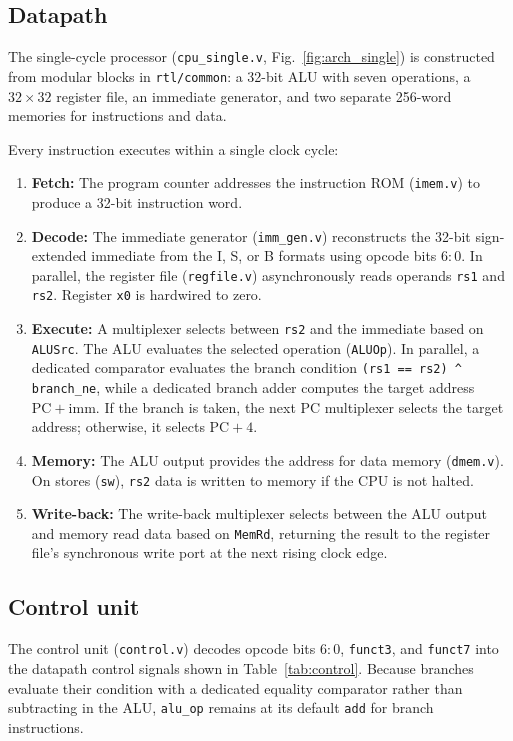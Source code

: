 \subsection{Datapath}
The single-cycle processor (\texttt{cpu\_single.v}, Fig.~\ref{fig:arch_single})
is constructed from modular blocks in \texttt{rtl/common}: a 32-bit ALU with
seven operations, a $32\times32$ register file, an immediate generator, and
two separate 256-word memories for instructions and data.

Every instruction executes within a single clock cycle:
\begin{enumerate}
\item \textbf{Fetch:} The program counter addresses the instruction ROM
(\texttt{imem.v}) to produce a 32-bit instruction word.
\item \textbf{Decode:} The immediate generator (\texttt{imm\_gen.v}) reconstructs
the 32-bit sign-extended immediate from the I, S, or B formats using opcode bits
$6:0$. In parallel, the register file (\texttt{regfile.v}) asynchronously reads
operands \texttt{rs1} and \texttt{rs2}. Register \texttt{x0} is hardwired to
zero.
\item \textbf{Execute:} A multiplexer selects between \texttt{rs2} and the
immediate based on \texttt{ALUSrc}. The ALU evaluates the selected operation
(\texttt{ALUOp}). In parallel, a dedicated comparator evaluates the branch
condition \texttt{(rs1 == rs2) \textasciicircum{} branch\_ne}, while a dedicated
branch adder computes the target address $\mathrm{PC} + \mathrm{imm}$. If the
branch is taken, the next PC multiplexer selects the target address; otherwise,
it selects $\mathrm{PC} + 4$.
\item \textbf{Memory:} The ALU output provides the address for data memory
(\texttt{dmem.v}). On stores (\texttt{sw}), \texttt{rs2} data is written to
memory if the CPU is not halted.
\item \textbf{Write-back:} The write-back multiplexer selects between the ALU
output and memory read data based on \texttt{MemRd}, returning the result to
the register file's synchronous write port at the next rising clock edge.
\end{enumerate}

\subsection{Control unit}
The control unit (\texttt{control.v}) decodes opcode bits $6:0$,
\texttt{funct3}, and \texttt{funct7} into the datapath control signals shown in
Table~\ref{tab:control}. Because branches evaluate their condition with a
dedicated equality comparator rather than subtracting in the ALU,
\texttt{alu\_op} remains at its default \texttt{add} for branch instructions.

